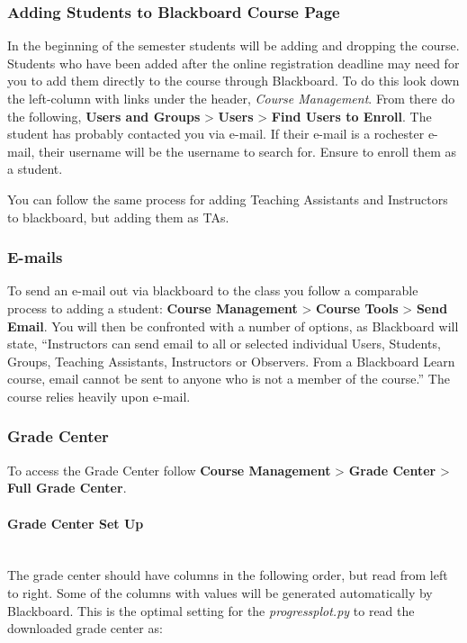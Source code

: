 \documentclass[12pt]{article}
\newcommand{\subsubsubsection}[1]{\paragraph{#1}\mbox{}\\}
\begin{document}
\subsubsection{Adding Students to Blackboard Course Page} \label{sec:addstuds}

\indent In the beginning of the semester students will be adding and dropping the course. Students who have been added after the online registration deadline may need for you to add them directly to the course through Blackboard. To do this look down the left-column with links under the header, \emph{Course Management}. From there do the following, \textbf{Users and Groups} > \textbf{Users} > \textbf{Find Users to Enroll}. The student has probably contacted you via e-mail. If their e-mail is a rochester e-mail, their username will be the username to search for. Ensure to enroll them as a student.

\indent You can follow the same process for adding Teaching Assistants and Instructors to blackboard, but adding them as TAs.

\subsubsection{E-mails} \label{sec:emails}

To send an e-mail out via blackboard to the class you follow a comparable process to adding a student: \textbf{Course Management} > \textbf{Course Tools} > \textbf{Send Email}. You will then be confronted with a number of options, as Blackboard will state, ``Instructors can send email to all or selected individual Users, Students, Groups, Teaching Assistants, Instructors or Observers. From a Blackboard Learn course, email cannot be sent to anyone who is not a member of the course.'' The course relies heavily upon e-mail.

\subsubsection{Grade Center} \label{sec:gc}

To access the Grade Center follow \textbf{Course Management} > \textbf{Grade Center} > \textbf{Full Grade Center}.

\subsubsubsection{Grade Center Set Up}

\noindent The grade center should have columns in the following order, but read from left to right. Some of the columns with values will be generated automatically by Blackboard. This is the optimal setting for the \emph{progressplot.py} to read the downloaded grade center as:
\end{document}
